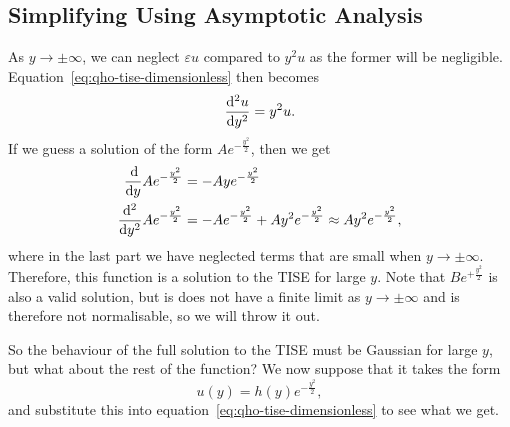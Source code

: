 \documentclass[../quantum_mechanics.tex]{subfiles}
\begin{document}
        \subsection{Simplifying Using Asymptotic Analysis}\label{sec:solving-the-quantum-harmonic-oscillator:subsec:simplifying-using-asymptotic-analysis}
            As $y\to\pm\infty$, we can neglect $\varepsilon u$ compared to $y^2u$ as the former will be negligible.
            Equation~\ref{eq:qho-tise-dimensionless} then becomes
            \begin{equation}
                \dv[2]{u}{y}=y^2u.
            \end{equation}
            If we guess a solution of the form $Ae^{-\frac{y^2}{2}}$, then we get
            \begin{align}
                \dv{}{y}Ae^{-\frac{y^2}{2}}&=-Aye^{-\frac{y^2}{2}}\\
                \dv[2]{}{y}Ae^{-\frac{y^2}{2}}&=-Ae^{-\frac{y^2}{2}}+Ay^2e^{-\frac{y^2}{2}}\approx Ay^2e^{-\frac{y^2}{2}},
            \end{align}
            where in the last part we have neglected terms that are small when $y\to\pm\infty$.
            Therefore, this function is a solution to the TISE for large $y$.
            Note that $Be^{+\frac{y^2}{2}}$ is also a valid solution, but is does not have a finite limit as $y\to\pm\infty$ and is therefore not normalisable, so we will throw it out.

            So the behaviour of the full solution to the TISE must be Gaussian for large $y$, but what about the rest of the function?
            We now suppose that it takes the form
            \begin{equation}
                u(y)=h(y)e^{-\frac{y^2}{2}},
            \end{equation}
            and substitute this into equation~\ref{eq:qho-tise-dimensionless} to see what we get.
\end{document}
